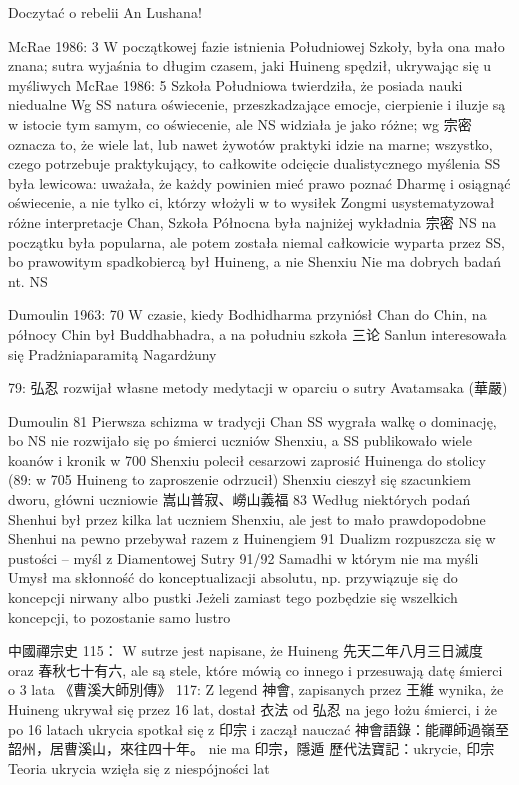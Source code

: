 Doczytać o rebelii An Lushana!

McRae 1986: 3
W początkowej fazie istnienia Południowej Szkoły, była ona mało znana; sutra wyjaśnia to długim czasem, jaki Huineng spędził, ukrywając się u myśliwych
McRae 1986: 5
Szkoła Południowa twierdziła, że posiada nauki niedualne
Wg SS natura oświecenie, przeszkadzające emocje, cierpienie i iluzje są w istocie tym samym, co oświecenie, ale NS widziała je jako różne; wg 宗密 oznacza to, że wiele lat, lub nawet żywotów praktyki idzie na marne; wszystko, czego potrzebuje praktykujący, to całkowite odcięcie dualistycznego myślenia
SS była lewicowa: uważała, że każdy powinien mieć prawo poznać Dharmę i osiągnąć oświecenie, a nie tylko ci, którzy włożyli w to wysiłek
Zongmi usystematyzował różne interpretacje Chan, Szkoła Północna była najniżej
wykładnia 宗密 NS na początku była popularna, ale potem została niemal całkowicie wyparta przez SS, bo prawowitym spadkobiercą był Huineng, a nie Shenxiu
Nie ma dobrych badań nt. NS

Dumoulin 1963: 70
W czasie, kiedy Bodhidharma przyniósł Chan do Chin, na północy Chin był Buddhabhadra, a na południu szkoła 三论
Sanlun interesowała się Pradżniaparamitą Nagardżuny

79: 弘忍 rozwijał własne metody medytacji w oparciu o sutry Avatamsaka (華嚴)

Dumoulin 81
Pierwsza schizma w tradycji Chan
SS wygrała walkę o dominację, bo NS nie rozwijało się po śmierci uczniów Shenxiu, a SS publikowało wiele koanów i kronik
w 700 Shenxiu polecił cesarzowi zaprosić Huinenga do stolicy
(89: w 705 Huineng to zaproszenie odrzucił)
Shenxiu cieszył się szacunkiem dworu, główni uczniowie 嵩山普寂、嶗山義福
83
Według niektórych podań Shenhui był przez kilka lat uczniem Shenxiu, ale jest to mało prawdopodobne
Shenhui na pewno przebywał razem z Huinengiem
91 Dualizm rozpuszcza się w pustości -- myśl z Diamentowej Sutry
91/92 Samadhi w którym nie ma myśli
Umysł ma skłonność do konceptualizacji absolutu, np. przywiązuje się do koncepcji nirwany albo pustki
Jeżeli zamiast tego pozbędzie się wszelkich koncepcji, to pozostanie samo lustro


中國禪宗史 115：
W sutrze jest napisane, że Huineng 先天二年八月三日滅度 oraz 春秋七十有六, ale są stele, które mówią co innego i przesuwają datę śmierci o 3 lata
《曹溪大師別傳》
117: Z legend 神會, zapisanych przez 王維 wynika, że Huineng ukrywał się przez 16 lat, dostał 衣法 od 弘忍 na jego łożu śmierci, i że po 16 latach ukrycia spotkał się z 印宗 i zaczął nauczać
神會語錄：能禪師過嶺至韶州，居曹溪山，來往四十年。 nie ma 印宗，隱遁
歷代法寶記：ukrycie, 印宗
Teoria ukrycia wzięła się z niespójności lat

